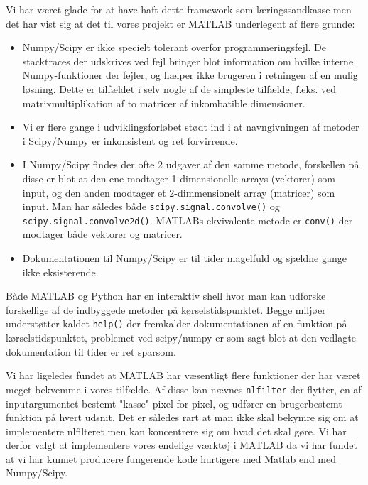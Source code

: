 Vi har været glade for at have haft dette framework som 
læringssandkasse men det har vist sig at det til vores projekt er MATLAB underlegent af flere grunde:
\begin{itemize}
	\item Numpy/Scipy er ikke specielt tolerant overfor programmeringsfejl. De stacktraces der udskrives ved fejl bringer blot information om hvilke interne Numpy-funktioner der fejler, og hælper ikke brugeren i retningen af en mulig løsning. Dette er tilfældet i selv nogle af de simpleste tilfælde, f.eks. ved matrixmultiplikation af to matricer af inkombatible dimensioner. %
	\item Vi er flere gange i udviklingsforløbet stødt ind i at navngivningen af metoder i Scipy/Numpy er inkonsistent og ret forvirrende. 
	\item I Numpy/Scipy findes der ofte 2 udgaver af den samme metode, forskellen på disse er blot at den ene modtager 1-dimensionelle arrays (vektorer) som input, og den anden modtager et 2-dimmensionelt array (matricer) som input. Man har således både \texttt{scipy.signal.convolve()} og \texttt{scipy.signal.convolve2d()}. MATLABs ekvivalente metode er \texttt{conv()} der modtager både vektorer og matricer.
	\item Dokumentationen til Numpy/Scipy er til tider magelfuld og sjældne gange ikke eksisterende. 
\end{itemize}

Både MATLAB og Python har en interaktiv shell hvor man kan udforske forskellige af de indbyggede metoder på kørselstidspunktet. Begge miljøer understøtter kaldet \texttt{help()} der fremkalder dokumentationen af en funktion på kørselstidspunktet, problemet ved scipy/numpy er som sagt blot at den vedlagte dokumentation til tider er ret sparsom.

Vi har ligeledes fundet at MATLAB har væsentligt flere funktioner der har været meget bekvemme i vores tilfælde. Af disse kan nævnes \texttt{nlfilter} der flytter, en af inputargumentet bestemt "kasse" pixel for pixel, og udfører en brugerbestemt funktion på hvert udsnit. Det er således rart at man ikke skal bekymre sig om at implementere nlfilteret men kan koncentrere sig om hvad det skal gøre. 
Vi har derfor valgt at implementere vores endelige værktøj i MATLAB da vi har fundet at vi har kunnet producere fungerende kode hurtigere med Matlab end med Numpy/Scipy. %
